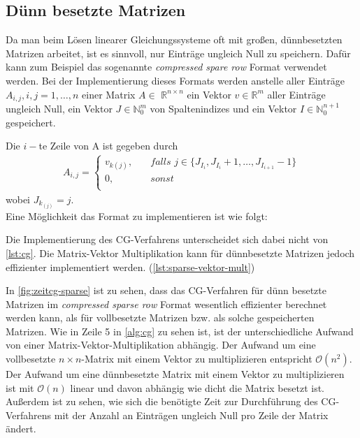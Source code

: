 \documentclass[12pt,a4paper]{scrartcl}
\numberwithin{equation}{section}
\numberwithin{myalgctr}{section}
\numberwithin{mytheoremctr}{subsection}
\numberwithin{mykorollarctr}{subsection}
\numberwithin{mylemmactr}{subsection}
\numberwithin{mybeispielctr}{subsection}
\begin{document}
	
	\subsection{Dünn besetzte Matrizen}
	
	Da man beim Lösen linearer Gleichungssysteme oft mit großen, dünnbesetzten Matrizen arbeitet, ist es sinnvoll, nur Einträge ungleich Null zu speichern. Dafür kann zum Beispiel das sogenannte \textit{compressed spare row} Format verwendet werden. Bei der Implementierung dieses Formats werden anstelle aller Einträge $A_{i,j}, i,j = 1,\ldots,n$ einer Matrix $A\in$ $\mathbb{R}^{n\times n}$ ein Vektor $v\in\mathbb{R}^{m}$ aller Einträge ungleich Null, ein Vektor $J\in\mathbb{N}_0^{m}$ von Spaltenindizes und ein Vektor $I\in\mathbb{N}_0^{n+1}$ gespeichert.
	
	Die $i-$te Zeile von A ist gegeben durch
	\begin{align*}
		A_{i,j} = 
		\begin{cases}
			\textit{$v_{k(j)}$},&\quad\textit{falls $j \in \{J_{I_i}, J_{I_{i}} + 1, \ldots, J_{I_{i+1}} - 1$}\}\\
			\textit{0},&\quad\textit{sonst}\\
		\end{cases}
	\end{align*} 
	wobei $J_{k_{(j)}} = j$.\\
	
	Eine Möglichkeit das Format zu implementieren ist wie folgt:
	
	 
	
	 
	
	
	Die Implementierung des CG-Verfahrens unterscheidet sich dabei nicht von \cref{lst:cg}. Die Matrix-Vektor Multiplikation kann f\"ur d\"unnbesetzte Matrizen jedoch effizienter implementiert werden.  (\cref{lst:sparse-vektor-mult})
	
	
	

	In \cref{fig:zeitcg-sparse} ist zu sehen, dass das CG-Verfahren f\"ur d\"unn besetzte Matrizen im \textit{compressed sparse row} Format wesentlich effizienter berechnet werden kann, als f\"ur vollbesetzte Matrizen bzw. als solche gespeicherten Matrizen.
	Wie in Zeile 5 in \cref{alg:cg} zu sehen ist, ist der unterschiedliche Aufwand von einer Matrix-Vektor-Multiplikation abh\"angig. Der Aufwand um eine vollbesetzte $n\times n$-Matrix mit einem Vektor zu multiplizieren entspricht $\mathcal{O}(n^2)$. Der Aufwand um eine d\"unnbesetzte Matrix mit einem Vektor zu multiplizieren ist mit $\mathcal{O}(n)$ linear und davon abh\"angig wie dicht die Matrix besetzt ist. Außerdem ist zu sehen, wie sich die ben\"otigte Zeit zur Durchf\"uhrung des CG-Verfahrens mit der Anzahl an Eintr\"agen ungleich Null pro Zeile der Matrix \"andert.
	
\end{document}
